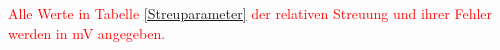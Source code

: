    
\textcolor{red}{Alle Werte in Tabelle \ref{Streuparameter} der relativen Streuung und ihrer  Fehler werden in mV angegeben.}   
    
